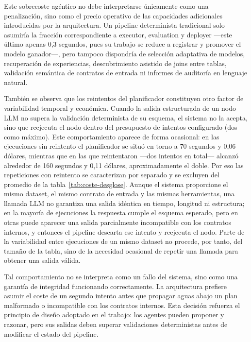 \documentclass[12pt,a4paper]{article}
\theoremstyle{plain}
\begin{document}
Este sobrecoste agéntico no debe interpretarse únicamente como una penalización, sino como el
precio operativo de las capacidades adicionales introducidas por la arquitectura. Un pipeline
determinista tradicional solo asumiría la fracción correspondiente a executor, evaluation y
deployer —este último apenas 0,3 segundos, pues su trabajo se reduce a registrar y promover el
modelo ganador—, pero tampoco dispondría de selección adaptativa de modelos, recuperación de
experiencias, descubrimiento asistido de joins entre tablas, validación semántica de contratos de
entrada ni informes de auditoría en lenguaje natural.

También se observa que los reintentos del planificador constituyen otro factor de variabilidad
temporal y económica. Cuando la salida estructurada de un nodo LLM no supera la validación
determinista de su esquema, el sistema no la acepta, sino que reejecuta el nodo dentro del
presupuesto de intentos configurado (dos como máximo). Este comportamiento aparece de forma
ocasional: en las ejecuciones sin reintento el planificador se situó en torno a 70 segundos y
0,06 dólares, mientras que en las que reintentaron —dos intentos en total— alcanzó alrededor de
160 segundos y 0,11 dólares, aproximadamente el doble. Por eso las repeticiones con reintento se
caracterizan por separado y se excluyen del promedio de la tabla~\ref{tab:coste-desglose}. Aunque
el sistema proporcione el mismo dataset, el mismo contrato de entrada y las mismas herramientas,
una llamada LLM no garantiza una salida idéntica en tiempo, longitud ni estructura; en la mayoría
de ejecuciones la respuesta cumple el esquema esperado, pero en otras puede aparecer una salida
parcialmente incompatible con los contratos internos, y entonces el pipeline descarta ese intento
y reejecuta el nodo. Parte de la variabilidad entre ejecuciones de un mismo dataset no procede,
por tanto, del tamaño de la tabla, sino de la necesidad ocasional de repetir una llamada para
obtener una salida válida.

Tal comportamiento no se interpreta como un fallo del sistema, sino como una garantía de
integridad funcionando correctamente. La arquitectura prefiere asumir el coste de un segundo
intento antes que propagar aguas abajo un plan malformado o incompatible con los contratos
internos. Esta decisión refuerza el principio de diseño adoptado en el trabajo: los agentes pueden
proponer y razonar, pero sus salidas deben superar validaciones deterministas antes de modificar
el estado del pipeline.
\end{document}

